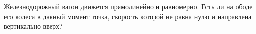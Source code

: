 Железнодорожный вагон движется прямолинейно и равномерно. Есть ли
на ободе его колеса в данный момент точка, скорость которой не равна
нулю и направлена вертикально вверх?
